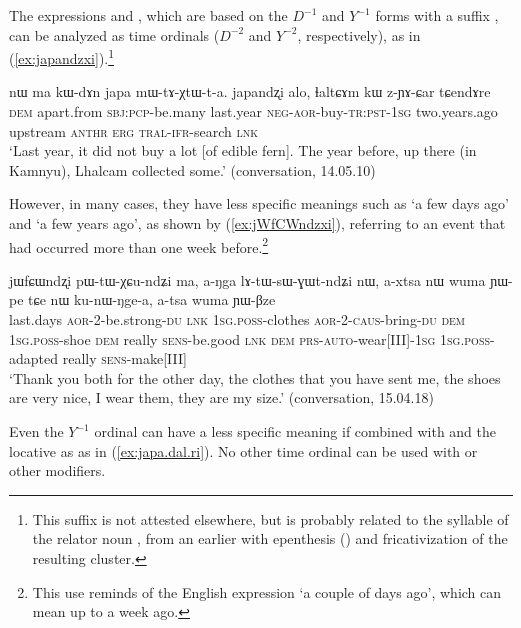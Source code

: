  The expressions   and , which are based on the $D^{-1}$ and $Y^{-1}$ forms with a suffix , can be analyzed as time ordinals ($D^{-2}$ and $Y^{-2}$, respectively), as in (\ref{ex:japandzxi}).\footnote{This suffix  is not attested elsewhere, but is probably related to the syllable  of the relator noun , from an earlier  with epenthesis () and fricativization of the resulting  cluster. }
 
\begin{exe}
\ex \label{ex:japandzxi}
\gll   nɯ ma kɯ-dɤn japa mɯ-tɤ-χtɯ-t-a. japandʐi alo, ɬaltɕɤm kɯ z-ɲɤ-ɕar tɕendɤre \\
 \textsc{dem} apart.from \textsc{sbj}:\textsc{pcp}-be.many last.year \textsc{neg}-\textsc{aor}-buy-\textsc{tr}:\textsc{pst}-\textsc{1sg}  two.years.ago upstream  \textsc{anthr} \textsc{erg} \textsc{tral}-\textsc{ifr}-search \textsc{lnk}   \\
\glt `Last year, it did not buy a lot [of edible fern]. The year before, up there (in Kamnyu), Lhalcam collected some.' (conversation, 14.05.10)
\end{exe}

However, in many cases, they have less specific meanings such as `a few days ago' and `a few years ago',  as shown by (\ref{ex:jWfCWndzxi}), referring to an event that had occurred more than one week before.\footnote{This use reminds of the English expression `a couple of days ago', which can mean up to a week ago. }

\begin{exe}
\ex \label{ex:jWfCWndzxi}
\gll jɯfɕɯndʐi pɯ-tɯ-χɕu-ndʑi ma, a-ŋga lɤ-tɯ-sɯ-ɣɯt-ndʑi nɯ, a-xtsa nɯ wuma ɲɯ-pe tɕe nɯ ku-nɯ-ŋge-a,  a-tsa wuma ɲɯ-βze \\ 
last.days \textsc{aor}-2-be.strong-\textsc{du} \textsc{lnk} \textsc{1sg}.\textsc{poss}-clothes \textsc{aor}-2-\textsc{caus}-bring-\textsc{du} \textsc{dem} \textsc{1sg}.\textsc{poss}-shoe \textsc{dem} really \textsc{sens}-be.good \textsc{lnk} \textsc{dem} \textsc{prs}-\textsc{auto}-wear[III]-\textsc{1sg}  \textsc{1sg}.\textsc{poss}-adapted really \textsc{sens}-make[III] \\
\glt `Thank you both for the other day, the clothes that you have sent me, the shoes are very nice, I wear them, they are my size.' (conversation, 15.04.18)
\end{exe}

Even the $Y^{-1}$ ordinal  can have a less specific meaning if combined with  and the locative  as  as in (\ref{ex:japa.dal.ri}). No other time ordinal can be used with  or other modifiers.

